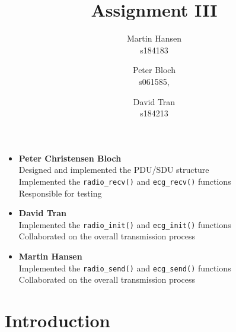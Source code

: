 \documentclass{article}
\title{Assignment III}
\author{Martin Hansen \\ s184183 \and Peter Bloch \\s061585, \and David Tran \\s184213}
\newcommand{\code}[1]{\texttt{#1}}
\begin{document}
	
	\maketitle
	
	
	\begin{itemize}
		\item \textbf{Peter Christensen Bloch}\\
			Designed and implemented the PDU/SDU structure\\
			Implemented the \code{radio\_recv()} and \code{ecg\_recv()} functions\\
			Responsible for testing	
		\item \textbf{David Tran}\\
			Implemented the \code{radio\_init()} and \code{ecg\_init()} functions\\
			Collaborated on the overall transmission process
		\item \textbf{Martin Hansen}\\
			Implemented the \code{radio\_send()} and \code{ecg\_send()} functions\\
			Collaborated on the overall transmission process
			
	\end{itemize}
	 
	
	\pagebreak
	
	\section{Introduction}
	
	
\end{document}
